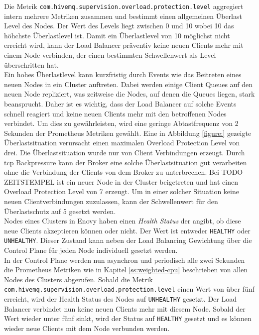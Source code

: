 Die Metrik \verb|com.hivemq.supervision.overload.protection.level| aggregiert intern mehrere Metriken zusammen und bestimmt einen allgemeinen Überlast Level des Nodes. Der Wert des Levels liegt zwischen 0 und 10 wobei 10 das höhchste Überlastlevel ist.
Damit ein Überlastlevel von 10 möglichst nicht erreicht wird, kann der Load Balancer präventiv keine neuen Clients mehr mit einem Node verbinden, der einen bestimmten Schwellenwert als Level überschritten hat.
\\
Ein hohes Überlastlevel kann kurzfristig durch Events wie das Beitreten eines neuen Nodes in ein Cluster auftreten. Dabei werden einige Client Queues auf den neuen Node repliziert, was zeitweise die Nodes, auf denen die Queues liegen, stark beansprucht. Daher ist es wichtig, dass der Load Balancer auf solche Events schnell reagiert und keine neuen Clients mehr mit den betroffenen Nodes verbindet.
Um dies zu gewährleisten, wird eine geringe Abtastfrequenz von 2 Sekunden der Prometheus Metriken gewählt.
Eine in Abbildung \ref{figure:} gezeigte Überlastsituation verursacht einen maximalen Overload Protection Level von drei. Die Überlastsituation wurde nur von Client Verbindungen erzeugt. Durch \ac{tcp} Backpressure kann der Broker eine solche Überlastsituation gut verarbeiten ohne die Verbindung der Clients von dem Broker zu unterbrechen. Bei TODO ZEITSTEMPEL ist ein neuer Node in der Cluster beigetreten und hat einen Overload Protection Level von 7 erzeugt. Um in einer solcher Situation keine neuen Clientverbindungen zuzulassen, kann der Schwellenwert für den Überlastschutz auf 5 gesetzt werden.
\\
Nodes eines Clusters in Enovy haben einen \textit{Health Status} der angibt, ob diese neue Clients akzeptieren können oder nicht. Der Wert ist entweder \verb|HEALTHY| oder \verb|UNHEALTHY|. Dieser Zustand kann neben der Load Balancing Gewichtung über die Control Plane für jeden Node individuell gesetzt werden.
\\
In der Control Plane werden nun asynchron und periodisch alle zwei Sekunden die Prometheus Metriken wie in Kapitel \ref{ss:weighted-cpu} beschrieben von allen Nodes des Clusters abgerufen. Sobald die Metrik \verb|com.hivemq.supervision.overload.protection.level| einen Wert von über fünf erreicht, wird der Health Status des Nodes auf \verb|UNHEALTHY| gesetzt. Der Load Balancer verbindet nun keine neuen Clients mehr mit diesem Node. Sobald der Wert wieder unter fünf sinkt, wird der Status auf \verb|HEALTHY| gesetzt und es können wieder neue Clients mit dem Node verbunden werden.

